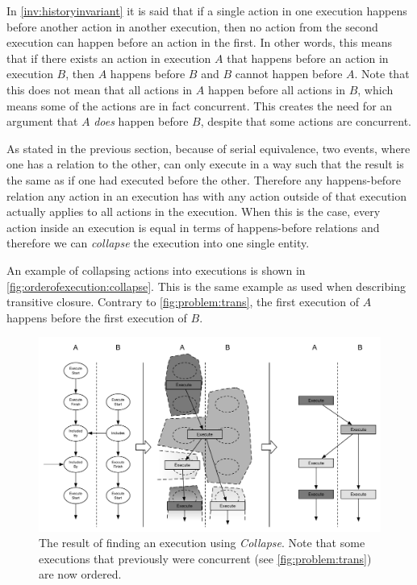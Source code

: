 	\newpar In \autoref{inv:historyinvariant} it is said that if a single action in one execution happens before another action in another execution, then no action from the second execution can happen before an action in the first. In other words, this means that if there exists an action in execution $A$ that happens before an action in execution $B$, then $A$ happens before $B$ and $B$ cannot happen before $A$. Note that this does not mean that all actions in $A$ happen before all actions in $B$, which means some of the actions are in fact concurrent. This creates the need for an argument that $A$ \textit{does} happen before $B$, despite that some actions are concurrent.
	
	\newpar As stated in the previous section, because of serial equivalence, two events, where one has a relation to the other, can only execute in a way such that the result is the same as if one had executed before the other. Therefore any happens-before relation any action in an execution has with any action outside of that execution actually applies to all actions in the execution. When this is the case, every action inside an execution is equal in terms of happens-before relations and therefore we can \textit{collapse} the execution into one single entity.
	
	\newpar An example of collapsing actions into executions is shown in \autoref{fig:orderofexecution:collapse}. This is the same example as used when describing transitive closure. Contrary to \autoref{fig:problem:trans}, the first execution of $A$ happens before the first execution of $B$.
	
	\begin{figure}[H]
		\centering
		\includegraphics[width=\textwidth]{5orderofexecution/images/collapse.pdf}
		\caption{The result of finding an execution using \textit{Collapse}. Note that some executions that previously were concurrent (see \autoref{fig:problem:trans}) are now ordered.}
		\label{fig:orderofexecution:collapse}
	\end{figure}
	
